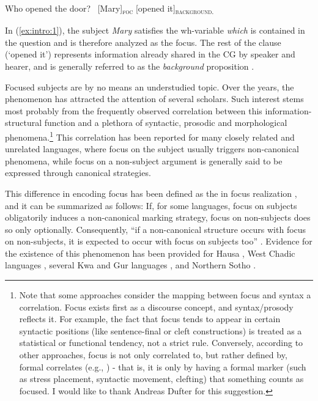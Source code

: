 \ea \label{ex:intro:1}
\ea Who opened the door?
\ex \ [Mary]\textsubscript{\textsc{foc}} \normalsize [opened it]\textsubscript{\textsc{background.}}\normalsize
\z \z

In (\ref{ex:intro:1}), the subject \textit{Mary} satisfies the wh-variable \textit{which} is contained in the question and is therefore analyzed as the focus. The rest of the clause (`opened it') represents information already shared in the CG by speaker and hearer, and is generally referred to as the \textit{background} proposition \parencite{von1982structured, krifka1991compositional, krifka2015structured}.

 Focused subjects are by no means an understudied topic. Over the years, the phenomenon has attracted the attention of several scholars. Such interest stems most probably from the frequently observed correlation between this informa\-tion-structural function and a plethora of syntactic, prosodic and morphological phenomena.\footnote{Note that some approaches consider the mapping between focus and syntax a correlation. Focus exists first as a discourse concept, and syntax/prosody reflects it. For example, the fact that focus tends to appear in certain syntactic positions (like sentence-final or cleft constructions) is treated as a statistical or functional tendency, not a strict rule. Conversely, according to other approaches, focus is not only correlated to, but rather defined by, formal correlates (e.g., \cite{chomsky1970some}) - that is, it is only by having a formal marker (such as stress placement, syntactic movement, clefting) that something counts as focused. I would like to thank Andreas Dufter for this suggestion.} This correlation has been reported for many closely related and unrelated languages, where focus on the subject usually triggers non-canonical phenomena, while focus on a non-subject argument is generally said to be expressed through  canonical strategies.
 
This difference in encoding focus has been defined as the  in focus realization \parencite{skopeteas2010focus}, and it can be summarized as follows: If, for some languages, focus on subjects obligatorily induces a non-canonical marking strategy, focus on non-subjects does so only optionally. Consequently, 
``if a non-canonical structure occurs with focus on non-subjects, it is expected to occur with focus on subjects too” \parencite[170--171]{skopeteas2010focus}. Evidence for the existence of this phenomenon has been provided for Hausa \parencite{hartmann2007place}, West Chadic languages \parencite{zimmermann2011grammatical}, several Kwa and Gur languages \parencite{fiedler2005out}, and Northern Sotho \parencite{zerbian2007investigating}.

